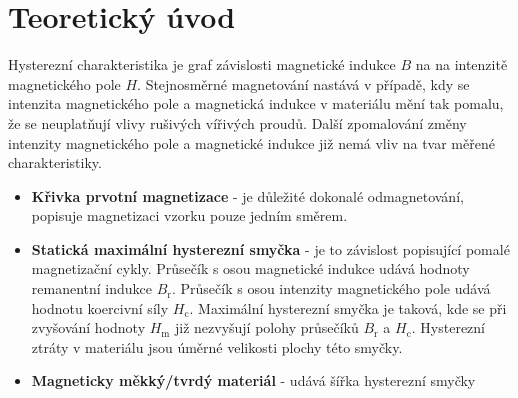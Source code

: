 \documentclass[a4paper, czech]{article}
\begin{document}
\section{Teoretický úvod}

Hysterezní charakteristika je graf závislosti magnetické indukce $B$ na na intenzitě magnetického pole $H$.
Stejnosměrné magnetování nastává v případě, kdy se intenzita magnetického pole a magnetická indukce v materiálu mění tak pomalu, že se neuplatňují vlivy rušivých vířivých proudů.
Další zpomalování změny intenzity magnetického pole a magnetické indukce již nemá vliv na tvar měřené charakteristiky.

\begin{itemize}
    \item \textbf{Křivka prvotní magnetizace} - je důležité dokonalé odmagnetování, popisuje magnetizaci vzorku pouze jedním směrem.
    \item \textbf{Statická maximální hysterezní smyčka} - je to závislost popisující pomalé magnetizační cykly. Průsečík s osou magnetické indukce udává hodnoty remanentní indukce $B_\text{r}$. Průsečík s osou intenzity magnetického pole udává hodnotu koercivní síly $H_\text{c}$. Maximální hysterezní smyčka je taková, kde se při zvyšování hodnoty $H_\text{m}$ již nezvyšují polohy průsečíků $B_\text{r}$ a $H_\text{c}$. Hysterezní ztráty v materiálu jsou úměrné velikosti plochy této smyčky.
    \item \textbf{Magneticky měkký/tvrdý materiál} - udává šířka hysterezní smyčky
\end{itemize}
\end{document}
